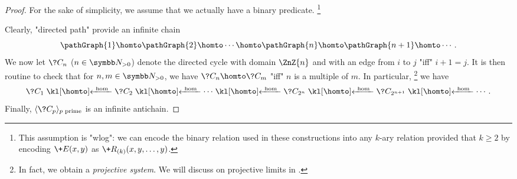\begin{proof}
	For the sake of simplicity, we assume that we actually have
	a binary predicate.%
	\footnote{This assumption is "wlog": we can encode the binary 
	relation used in these constructions into any $k$-ary
	relation provided that $k \geq 2$ by encoding $\+E(x,y)$
	as $\+R_{(k)}(x,y,\dotsc,y)$.}

	Clearly, "directed path" provide an infinite chain
	\[
		\pathGraph{1} \homto \pathGraph{2} \homto \cdots
			\homto \pathGraph{n} \homto \pathGraph{n+1} \homto \cdots.
	\]
	We now let $\?C_n$ ($n\in\Np$) denote the directed cycle with domain $\ZnZ{n}$
	and with an edge from $i$ to $j$ "iff" $i+1 = j$.
	It is then routine to check that for $n,m\in\Np$, we have $\?C_n \homto \?C_m$
	"iff" $n$ is a multiple of $m$. In particular,%
	\footnote{In fact, we obtain a \emph{projective system}. We will discuss
	on projective limits in .}
	we have
	\[
		\?C_1 \cohomto \?C_2 \cohomto \cdots \cohomto \?C_{2^n} \cohomto \?C_{2^{n+1}} \cohomto \cdots.
	\]
	Finally, $\tup{\?C_p}_{p \text{ prime}}$ is an infinite antichain.
\end{proof}

